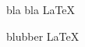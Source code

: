 \documentclass{article}
\begin{document}
\begin{example}
  bla bla \LaTeX
\end{example}

\bigskip

\begin{code}
  blubber \LaTeX
\end{code}
\end{document}
